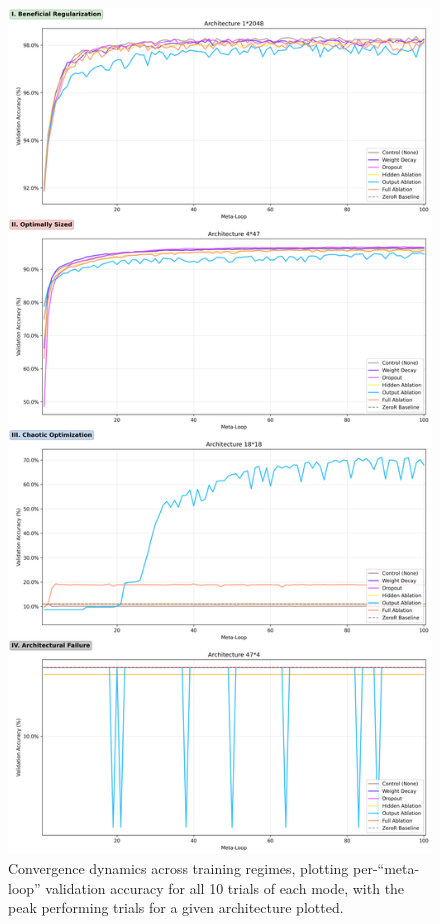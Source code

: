\documentclass[conference]{IEEEtran}
\begin{document}
\begin{figure}[ht]
    \centering
    \includegraphics[width=\columnwidth]{SimpleMLP_Plot_Convergence.png}
    \caption{Convergence dynamics across training regimes, plotting per-``meta-loop'' validation accuracy for all 10 trials of each mode, with the peak performing trials for a given architecture plotted.}
    \label{fig:convergence_plots}
\end{figure}
\end{document}
